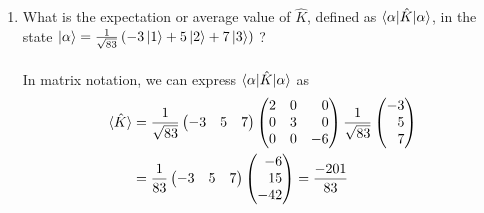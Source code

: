 \documentclass[11pt,letterpaper]{article}
\begin{document}
\begin{enumerate}
\begin{enumerate}
  \item What is the expectation or average value of $\hat K$, defined as $\braket{\alpha|\hat K| \alpha}$, in the state $\ket \alpha = \frac{1}{\sqrt{83}}\left(-3\ket 1 + 5\ket 2 + 7 \ket 3\right)$ ?
  \\ \\ In matrix notation, we can express $\braket{\alpha|\hat K|\alpha}$ as
  \begin{align*}\braket{\hat K}&=\frac{1}{\sqrt{83}}\begin{pmatrix}-3&5&7\end{pmatrix}
  \begin{pmatrix*}[r] 2&0&0\\0&3&0\\0&0&-6\end{pmatrix*}
  \frac{1}{\sqrt{83}}\begin{pmatrix*}[r]-3\\5\\7\end{pmatrix*}\\
  &= \frac{1}{83}\begin{pmatrix}-3&5&7\end{pmatrix}
  \begin{pmatrix*}[r] -6\\15\\-42\end{pmatrix*} = \frac{-201}{83}\end{align*}
  

\end{enumerate}
\end{enumerate}
\end{document}
